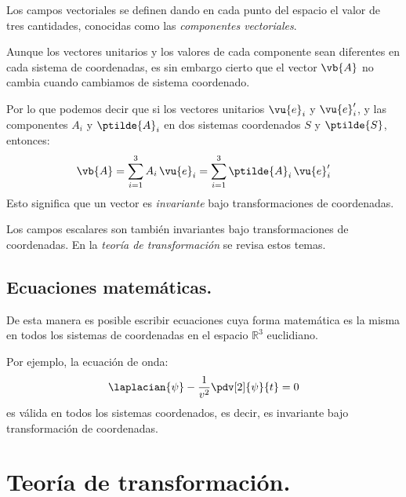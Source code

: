 Los campos vectoriales se definen dando en cada punto del espacio el valor de tres cantidades, conocidas como las \emph{componentes vectoriales}.
\par
Aunque los vectores unitarios y los valores de cada componente sean diferentes en cada sistema de coordenadas, es sin embargo cierto que el vector $\vb{A}$ no cambia cuando cambiamos de sistema coordenado.
\par
Por lo que podemos decir que si los vectores unitarios $\vu{e}_{i}$ y $\vu{e}_{i}^{\prime}$, y las componentes $A_{i}$ y $\ptilde{A}_{i}$ en dos sistemas coordenados $S$ y $\ptilde{S}$, entonces:
\begin{align*}
\vb{A} = \sum_{i=1}^{3} A_{i} \, \vu{e}_{i} = \sum_{i=1}^{3} \ptilde{A}_{i} \, \vu{e}_{i}^{\prime}
\end{align*}
Esto significa que un vector es \emph{invariante} bajo transformaciones de coordenadas.
\par
Los campos escalares son también invariantes bajo transformaciones de coordenadas. En la \emph{teoría de transformación} se revisa estos temas.

\subsection*{Ecuaciones matemáticas.}

De esta manera es posible escribir ecuaciones cuya forma matemática es la misma en todos los sistemas de coordenadas en el espacio $\mathbb{R}^{3}$ euclidiano.
\par
Por ejemplo, la ecuación de onda:
\begin{align*}
\laplacian{\psi} - \dfrac{1}{v^{2}} \pdv[2]{\psi}{t} = 0
\end{align*}
es válida en todos los sistemas coordenados, es decir, es invariante bajo transformación de coordenadas.

\section{Teoría de transformación.}

